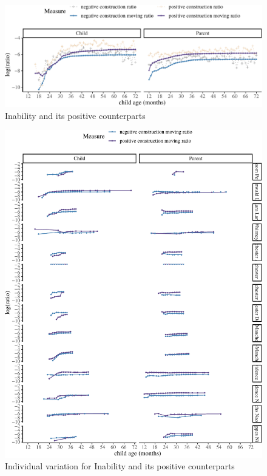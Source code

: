 \documentclass[
  english,
  man,floatsintext]{apa6}
\begin{document}
\begin{figure}[H]

{\centering \includegraphics{neg_construction_article_files/figure-latex/inability-1} 

}

\caption{Inability and its positive counterparts}\label{fig:inability}
\end{figure}

\begin{figure}[H]

{\centering \includegraphics{neg_construction_article_files/figure-latex/individualinability-1} 

}

\caption{Individual variation for Inability and its positive counterparts}\label{fig:individualinability}
\end{figure}
\end{document}
